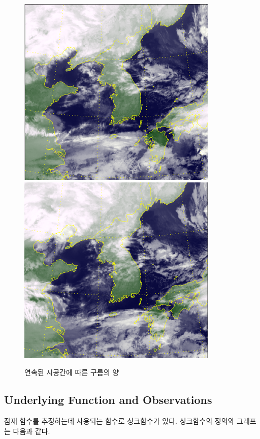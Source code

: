 \documentclass[a4paper]{oblivoir}
\begin{document}
\begin{figure}[ht] \centering
\centering
\includegraphics[scale=0.6]{fig12_2.png}\hspace{0.2cm}\includegraphics[scale=0.6]{fig12_3.png}
\caption{연속된 시공간에 따른 구름의 양}
\label{fig:12-2}
\end{figure}

\subsection{Underlying Function and Observations}

잠재 함수를 추정하는데 사용되는 함수로 싱크함수가 있다. 싱크함수의 정의와 그래프는 다음과 같다.\\
\end{document}
